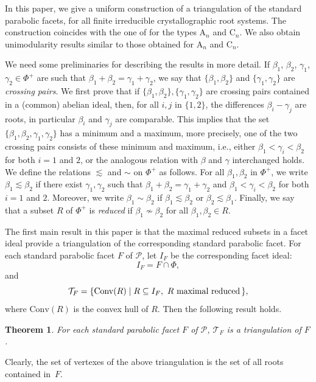 \documentclass[10pt]{amsart}
\newtheorem{thm}{Theorem}[section]
\theoremstyle{definition}
\theoremstyle{remark}
\newcommand\mc{\mathcal}
\newcommand\pol{\mathcal P}
\newcommand\conv{\mathrm{Conv}}
\newcommand\be{\beta}
\newcommand\ga{\gamma}
\newcommand\nosim{\not\sim}
\begin{document}
\par
In this paper, we give a uniform construction of a triangulation of the standard parabolic facets,  for all finite irreducible crystallographic root systems. 
The construction coincides with the one of \cite{CM2} for the types $\mathrm A_n$ and $\mathrm C_n$.  
We also obtain unimodularity results similar to those obtained for $\mathrm A_n$ and $\mathrm C_n$.  

\par
We need some preliminaries for describing the results in more detail.
If $\be_1$, $\be_2$, $\ga_1$, $\ga_2\in \Phi^+$ are such that $\be_1+\be_2=\ga_1+\ga_2$, we say that $\{\be_1, \be_2\}$ and $\{\ga_1, \ga_2\}$ are {\it crossing pairs}. 
We first prove that if $\{\be_1,\be_2\}, \{\ga_1, \ga_2\}$ are crossing pairs contained in a (common) abelian ideal,  then, for all $i, j$ in $\{1, 2\}$, the differences $\be_i-\ga_j$ are roots, in particular  $\be_i$ and $\ga_j$ are comparable. 
This implies that the set $\{\be_1,\be_2, \ga_1, \ga_2\}$ has a minimum and a maximum, more precisely, one of the two crossing pairs consists of these minimum and maximum, i.e., either $\be_1< \ga_i< \be_2$ for both $i=1$ and $2$, or the analogous relation with $\be$ and $\ga$ interchanged holds.
We define the relations $\lesssim$ and $\sim$ on $\Phi^+$ as follows.
For all $\be_1, \be_2$ in $\Phi^+$, we write $\be_1\lesssim \be_2$ if there exist 
$\ga_1, \ga_2$ such that $\be_1+\be_2=\ga_1+\ga_2$ and $\be_1< \ga_i< \be_2$ for both $i=1$ and $2$. 
Moreover, we write $\be_1\sim \be_2$ if $\be_1\lesssim \be_2$ or $\be_2\lesssim \be_1$.
Finally, we say that a subset $R$ of $\Phi^+$ is {\it reduced} if $\be_1\nosim \be_2$ for all $\be_1, \be_2\in R$.  

\par
The first main result in this paper is that the maximal reduced subsets in a facet ideal provide a triangulation of the corresponding standard parabolic facet.
For each standard parabolic facet $F$ of $\pol$, let $I_F$ be the corresponding facet ideal:
$$
I_F=F\cap \Phi,
$$
and
$$
\mc T_F=\{\conv(R)\mid R\subseteq I_F,\ R \text { maximal reduced\,}\},
$$
where $\conv(R)$ is the convex hull of $R$. 
Then the following result holds.

\begin{thm}\label{thm:main1-intro}
For each standard parabolic facet  $F$ of $\pol$,  $\mc T_F$ is a triangulation of $F$.
\end{thm}

\par
Clearly, the set of vertexes of the above triangulation is the set of all roots contained in~$F$. 
\end{document}
